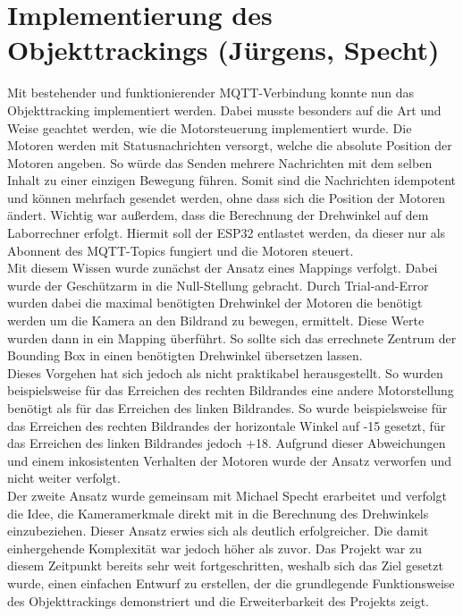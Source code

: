 \section{Implementierung des Objekttrackings (Jürgens, Specht)} \label{sec:objekttracking}
Mit bestehender und funktionierender MQTT-Verbindung konnte nun das Objekttracking implementiert werden. Dabei musste besonders auf die Art und Weise geachtet werden, wie die Motorsteuerung implementiert wurde. Die Motoren werden mit Statusnachrichten versorgt, welche die absolute Position der Motoren angeben. So würde das Senden mehrere Nachrichten mit dem selben Inhalt zu einer einzigen Bewegung führen. Somit sind die Nachrichten idempotent und können mehrfach gesendet werden, ohne dass sich die Position der Motoren ändert.
Wichtig war außerdem, dass die Berechnung der Drehwinkel auf dem Laborrechner erfolgt. Hiermit soll der ESP32 entlastet werden, da dieser nur als Abonnent des MQTT-Topics fungiert und die Motoren steuert. 
\\
Mit diesem Wissen wurde zunächst der Ansatz eines Mappings verfolgt. Dabei wurde der Geschützarm in die Null-Stellung gebracht. Durch Trial-and-Error wurden dabei die maximal benötigten Drehwinkel der Motoren die benötigt werden um die Kamera an den Bildrand zu bewegen, ermittelt. Diese Werte wurden dann in ein Mapping überführt. So sollte sich das errechnete Zentrum der Bounding Box in einen benötigten Drehwinkel übersetzen lassen.\\
Dieses Vorgehen hat sich jedoch als nicht praktikabel herausgestellt. So wurden beispielsweise für das Erreichen des rechten Bildrandes eine andere Motorstellung benötigt als für das Erreichen des linken Bildrandes. So wurde beispielsweise für das Erreichen des rechten Bildrandes der horizontale Winkel auf -15 gesetzt, für das Erreichen des linken Bildrandes jedoch +18. Aufgrund dieser Abweichungen und einem inkosistenten Verhalten der Motoren wurde der Ansatz verworfen und nicht weiter verfolgt.
\\
Der zweite Ansatz wurde gemeinsam mit Michael Specht erarbeitet und verfolgt die Idee, die Kameramerkmale direkt mit in die Berechnung des Drehwinkels einzubeziehen. Dieser Ansatz erwies sich als deutlich erfolgreicher. Die damit einhergehende Komplexität war jedoch höher als zuvor. Das Projekt war zu diesem Zeitpunkt bereits sehr weit fortgeschritten, weshalb sich das Ziel gesetzt wurde, einen einfachen Entwurf zu erstellen, der die grundlegende Funktionsweise des Objekttrackings demonstriert und die Erweiterbarkeit des Projekts zeigt. \newline

